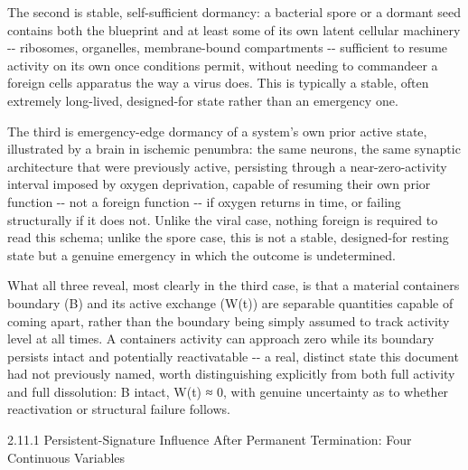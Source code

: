 \documentclass[
]{article}
\begin{document}
The second is stable, self-sufficient dormancy: a bacterial spore or a
dormant seed contains both the blueprint and at least some of its own
latent cellular machinery -\/- ribosomes, organelles, membrane-bound
compartments -\/- sufficient to resume activity on its own once
conditions permit, without needing to commandeer a foreign cells
apparatus the way a virus does. This is typically a stable, often
extremely long-lived, designed-for state rather than an emergency one.

The third is emergency-edge dormancy of a system's own prior active
state, illustrated by a brain in ischemic penumbra: the same neurons,
the same synaptic architecture that were previously active, persisting
through a near-zero-activity interval imposed by oxygen deprivation,
capable of resuming their own prior function -\/- not a foreign function
-\/- if oxygen returns in time, or failing structurally if it does not.
Unlike the viral case, nothing foreign is required to read this schema;
unlike the spore case, this is not a stable, designed-for resting state
but a genuine emergency in which the outcome is undetermined.

What all three reveal, most clearly in the third case, is that a
material containers boundary (B) and its active exchange (W(t)) are
separable quantities capable of coming apart, rather than the boundary
being simply assumed to track activity level at all times. A containers
activity can approach zero while its boundary persists intact and
potentially reactivatable -\/- a real, distinct state this document had
not previously named, worth distinguishing explicitly from both full
activity and full dissolution: B intact, W(t) ≈ 0, with genuine
uncertainty as to whether reactivation or structural failure follows.

2.11.1 Persistent-Signature Influence After Permanent Termination: Four
Continuous Variables
\end{document}
